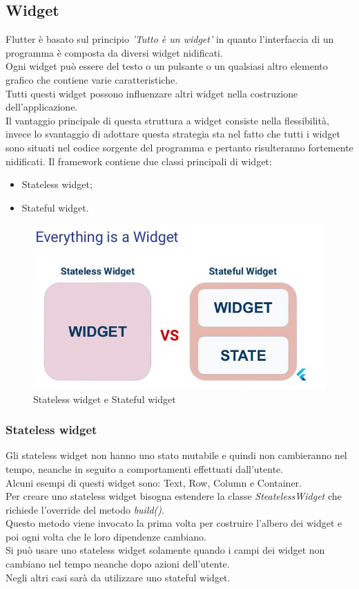 \subsection{Widget}
\label{sec:Widget}
Flutter è basato sul principio \textit{'Tutto è un widget'} in quanto l'interfaccia di un programma è composta da diversi widget nidificati.\\
Ogni widget può essere del testo o un pulsante o un qualsiasi altro elemento grafico che contiene varie caratteristiche.\\
Tutti questi widget possono influenzare altri widget nella costruzione dell'applicazione.\\
Il vantaggio principale di questa struttura a widget consiste nella flessibilità, invece lo svantaggio di adottare questa strategia sta nel fatto che tutti i widget sono situati nel codice sorgente del programma e pertanto risulteranno fortemente nidificati.
\newpage
Il framework contiene due classi principali di widget: \cite{state, flutterd}
\begin{itemize}
	\item Stateless widget;   
	\item Stateful widget.
\end{itemize}

\begin{figure}[htbp]	
	\centering
	\includegraphics[width=12cm]{immagini/state.jpeg}
	\caption{Stateless widget e Stateful widget}
	\label{fig:Stateless widget e Stateful widget}
\end{figure}
\subsubsection{Stateless widget}
Gli stateless widget non hanno uno stato mutabile e quindi non cambieranno nel tempo, neanche in seguito a comportamenti effettuati dall'utente.\\
Alcuni esempi di questi widget sono: Text, Row, Column e Container.\\
Per creare uno stateless widget bisogna estendere la classe \textit{SteatelessWidget} che richiede l'override del metodo \textit{build()}.\\
Questo metodo viene invocato la prima volta per costruire l'albero dei widget e poi ogni volta che le loro dipendenze cambiano.\\
Si può usare uno stateless widget solamente quando i campi dei widget non cambiano nel tempo neanche dopo azioni dell'utente.\\
Negli altri casi sarà da utilizzare uno stateful widget.

